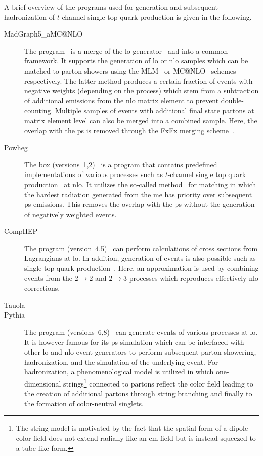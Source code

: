 A brief overview of the programs used for generation and subsequent hadronization of $t$-channel single top quark production is given in the following.

\begin{description}
\item[MadGraph5\_aMC{@}NLO] The \MGAMC program~\cite{Alwall:2014hca} is a merge of the \gls{lo} \MG generator~\cite{Alwall:2011uj} and \AMC into a common framework. It supports the generation of \gls{lo} or \gls{nlo} samples which can be matched to parton showers using the MLM~\cite{Mangano:2006rw} or MC{@}NLO~\cite{Frixione:2002ik} schemes respectively. The latter method produces a certain fraction of events with negative weights (depending on the process) which stem from a subtraction of additional emissions from the \gls{nlo} matrix element to prevent double-counting. 
Multiple samples of events with additional final state partons at matrix element level can also be merged into a combined sample. Here, the overlap with the \gls{ps} is removed through the FxFx merging scheme~\cite{Frederix:2012ps}.

\item[Powheg] The \POWHEG box (versions~1,2)~\cite{Alioli:2010xd} is a program that contains predefined implementations of various processes such as $t$-channel single top quark production~\cite{Alioli:2009je} at \gls{nlo}. It utilizes the so-called \POWHEG method~\cite{Frixione:2007vw} for matching in which the hardest radiation generated from the \gls{me} has priority over subsequent \gls{ps} emissions. This removes the overlap with the \gls{ps} without the generation of negatively weighted events.

\item[CompHEP] The \COMPHEP program (version~4.5)~\cite{Boos:2004kh} can perform calculations of cross sections from Lagrangians at \gls{lo}. In addition, generation of events is also possible such as single top quark production~\cite{Boos:2006af}. Here, an approximation is used by combining events from the $2\to2$ and $2\to3$ processes which reproduces effectively \gls{nlo} corrections.

\item[Tauola] 

\item[Pythia] The \PYTHIA program (versions~6,8)~\cite{Sjostrand:2006za,Sjostrand:2014zea} can generate events of various processes at \gls{lo}. It is however famous for its \gls{ps} simulation which can be interfaced with other \gls{lo} and \gls{nlo} event generators to perform subsequent parton showering, hadronization, and the simulation of the underlying event. For hadronization, a phenomenological model is utilized in which one-dimensional strings\footnote{The string model is motivated by the fact that the spatial form of a dipole color field does not extend radially like an \gls{em} field but is instead squeezed to a tube-like form.} connected to partons reflect the color field leading to the creation of additional partons through string branching and finally to the formation of color-neutral singlets.


\end{description}
